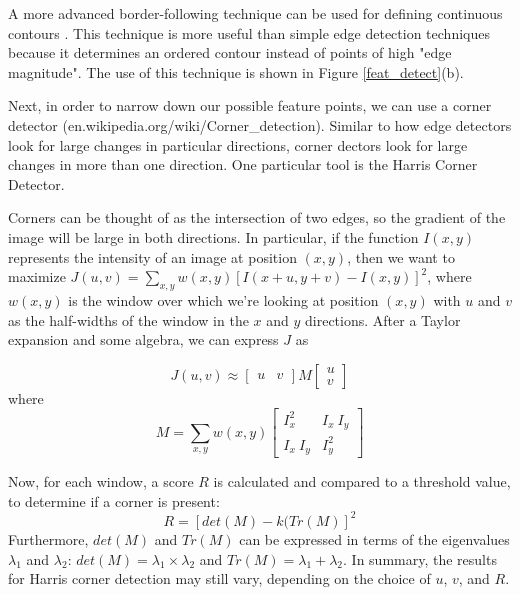 \documentclass[paper=a4, fontsize=11pt]{scrartcl} %
\begin{document}
A more advanced border-following technique can be used for defining continuous contours \cite{Suzuki1985}. This technique is more useful than simple edge detection techniques because it determines an ordered contour instead of points of high "edge magnitude". The use of this technique is shown in Figure \ref{feat_detect}(b).


Next, in order to narrow down our possible feature points, we can use a corner detector (en.wikipedia.org/wiki/Corner\_detection). Similar to how edge detectors look for large changes in particular directions, corner dectors look for large changes in more than one direction. One particular tool is the Harris Corner Detector.

Corners can be thought of as the intersection of two edges, so the gradient of the image will be large in both directions. In particular, if the function $I(x, y)$ represents the intensity of an image at position $(x, y)$, then we want to maximize $J(u, v) = \sum_{x,y} w(x, y) [I(x+u, y+v) - I(x, y)]^2$, where $w(x, y)$ is the window over which we’re looking at position $(x, y)$ with $u$ and $v$ as the half-widths of the window in the $x$ and $y$ directions. After a Taylor expansion and some algebra, we can express $J$ as 

$$
J(u, v) \approx \begin{bmatrix}
u & v
\end{bmatrix} M \begin{bmatrix}
u\\
v
\end{bmatrix}
$$
where
$$
M = \sum_{x,y} w(x, y) \begin{bmatrix}
I_x^2 & I_x~I_y \\ I_x~I_y & I_y^2
\end{bmatrix}
$$

Now, for each window, a score $R$ is calculated and compared to a threshold value, to determine if a corner is present:
$$
R = [det(M) - k(Tr(M)]^2
$$
Furthermore, $det(M)$ and $Tr(M)$ can be expressed in terms of the eigenvalues $\lambda_1$ and $\lambda_2$: $det(M) = \lambda_1 \times \lambda_2$ and $Tr(M) = \lambda_1 + \lambda_2$. In summary, the results for Harris corner detection may still vary, depending on the choice of $u$, $v$, and $R$.
\end{document}
